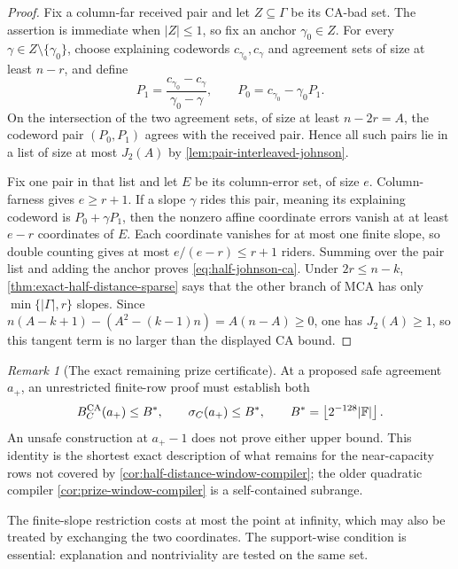 \documentclass[11pt,a4paper]{amsart}
\numberwithin{equation}{section}
\theoremstyle{remark}
\newtheorem{remark}[remark]{Remark}
\newcommand{\F}{\mathbb F}
\newcommand{\abs}[1]{\lvert #1\rvert}
\newcommand{\floor}[1]{\left\lfloor #1\right\rfloor}
\begin{document}
\begin{proof}
Fix a column-far received pair and let \(Z\subseteq\Gamma\) be its
CA-bad set.  The assertion is immediate when \(\abs Z\le1\), so fix an
anchor \(\gamma_0\in Z\).  For every
\(\gamma\in Z\setminus\{\gamma_0\}\), choose explaining codewords
\(c_{\gamma_0},c_\gamma\) and agreement sets of size at least \(n-r\),
and define
\[
 P_1=\frac{c_{\gamma_0}-c_\gamma}{\gamma_0-\gamma},
 \qquad P_0=c_{\gamma_0}-\gamma_0P_1.
\]
On the intersection of the two agreement sets, of size at least
\(n-2r=A\), the codeword pair \((P_0,P_1)\) agrees with the received
pair.  Hence all such pairs lie in a list of size at most \(J_2(A)\) by
\cref{lem:pair-interleaved-johnson}.

Fix one pair in that list and let \(E\) be its column-error set, of size
\(e\).  Column-farness gives \(e\ge r+1\).  If a slope \(\gamma\) rides
this pair, meaning its explaining codeword is \(P_0+\gamma P_1\), then
the nonzero affine coordinate errors vanish at at least \(e-r\)
coordinates of \(E\).  Each coordinate vanishes for at most one finite
slope, so double counting gives at most
\(e/(e-r)\le r+1\) riders.  Summing over the pair list and adding the
anchor proves \eqref{eq:half-johnson-ca}.  Under \(2r\le n-k\),
\cref{thm:exact-half-distance-sparse} says that the other branch of MCA
has only \(\min\{\abs\Gamma,r\}\) slopes.  Since
\(n(A-k+1)-(A^2-(k-1)n)=A(n-A)\ge0\), one has \(J_2(A)\ge1\), so this
tangent term is no larger than the displayed CA bound.
\end{proof}

\begin{remark}[The exact remaining prize certificate]
\label{rem:exact-prize-certificate}
At a proposed safe agreement \(a_+\), an unrestricted finite-row proof
must establish both
\[
 B_C^{\rm CA}(a_+)\le B^*,\qquad
 \sigma_C(a_+)\le B^*,\qquad
 B^*=\floor{2^{-128}\abs\F}.
\]
An unsafe construction at \(a_+-1\) does not prove either upper bound.
This identity is the shortest exact description of what remains for the
near-capacity rows not covered by
\cref{cor:half-distance-window-compiler}; the older quadratic compiler
\cref{cor:prize-window-compiler} is a self-contained subrange.
\end{remark}

The finite-slope restriction costs at most the point at infinity, which may
also be treated by exchanging the two coordinates.  The support-wise
condition is essential: explanation and nontriviality are tested on the
same set.
\end{document}
